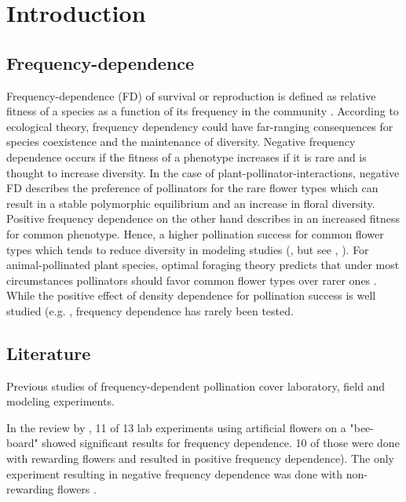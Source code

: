 \section{Introduction}


\subsection*{Frequency-dependence}

Frequency-dependence (FD) of survival or reproduction is defined as relative fitness of a species as a function of its frequency in the community \citep{ayala1974frequency,wright1946genetics}.
According to ecological theory, frequency dependency could have far-ranging consequences for species coexistence and the maintenance of diversity. 
Negative frequency dependence occurs if the fitness of a phenotype increases if it is rare and is thought to increase diversity. In the case of plant-pollinator-interactions, negative FD describes the preference of pollinators for the rare flower types which can result in a stable polymorphic equilibrium and an increase in floral diversity. Positive frequency dependence on the other hand describes in an increased fitness for common phenotype. Hence, a higher pollination success for common flower types which tends to reduce diversity in modeling studies (\citealt{may1974stability}, but see \citealt{bever1999dynamics}, \citealt{molofsky2002novel}).
 For animal-pollinated plant species, optimal foraging theory predicts that under most circumstances pollinators should favor common flower types over rarer ones \citep{kunin1996pollinator}. While the positive effect of density dependence for pollination success is well studied (e.g. \citealt{essenberg2012explaining,bernhardt2008effects,kunin1993sex,morris2010benefit}, frequency dependence has rarely been tested.

\subsection*{Literature}

Previous studies of frequency-dependent pollination cover laboratory, field and modeling experiments.

In the review by \cite{smithson2001pollinator}, 11 of 13 lab experiments using artificial flowers on a "bee-board" showed significant results for frequency dependence. 10 of those were done with rewarding flowers and resulted in positive frequency dependence\citep{smithson1996frequency,smithson1997density}). The only experiment resulting in negative frequency dependence was done with non-rewarding flowers \citep{smithson1997negative}. 

